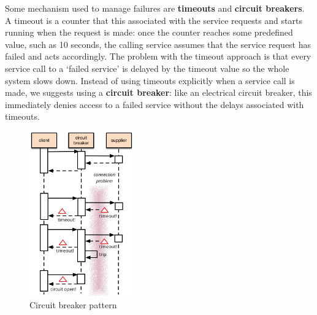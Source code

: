 \documentclass[10pt,a4paper]{report}
\begin{document}
Some mechanism used to manage failures are \textbf{timeouts} and \textbf{circuit breakers}.\\
A timeout is a counter that this associated with the service requests and
starts running when the request is made: once the counter reaches some predefined value, such as 10 seconds,
the calling service assumes that the service request has failed and acts
accordingly.
The problem with the timeout approach is that every service call to a ‘failed service’ is delayed by the timeout value so the whole system slows down. Instead of using timeouts explicitly when a service call is made, we suggests using a \textbf{circuit breaker}: like an electrical circuit breaker, this immediately denies access to a failed service without the delays associated with timeouts.
\begin{figure}[h]
	\centering
	\includegraphics[width=0.4\textwidth]{image64}
	\caption{Circuit breaker pattern}
	\label{image64}
\end{figure} 
\end{document}
